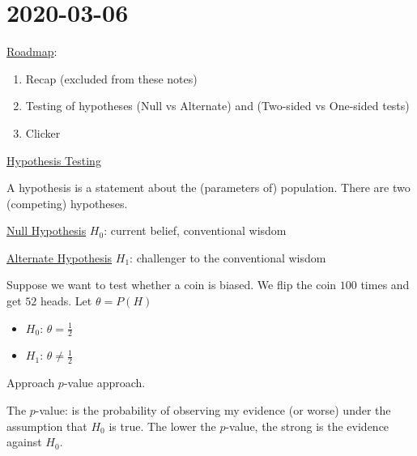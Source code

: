 \section{2020-03-06}
\underline{Roadmap}:
\begin{enumerate}[label=(\roman*)]
    \item Recap (excluded from these notes)
    \item Testing of hypotheses (Null vs Alternate) and (Two-sided vs One-sided tests)
    \item Clicker
\end{enumerate}
\underline{Hypothesis Testing}

\begin{Definition}{}{}
    A hypothesis is a statement about the (parameters of) population. There
    are two (competing) hypotheses.

    \underline{Null Hypothesis} $ H_0 $: current belief, conventional wisdom

    \underline{Alternate Hypothesis} $ H_1 $: challenger to the conventional wisdom
\end{Definition}



\begin{Example}{}{}
    Suppose we want to test whether a coin is biased. We flip the coin $ 100 $
    times and get $ 52 $ heads. Let $ \theta=P(H) $
    \begin{itemize}
        \item $ H_0 $: $ \theta=\frac{1}{2} $
        \item $ H_1 $: $ \theta\neq \frac{1}{2} $
    \end{itemize}
    Approach $ p $-value approach.
\end{Example}



\begin{Definition}{}{}
    The $ p $-value: is the probability of observing my evidence (or worse)
    under the assumption that $ H_0 $ is true. The lower the $ p $-value,
    the strong is the evidence against $ H_0 $.
\end{Definition}

